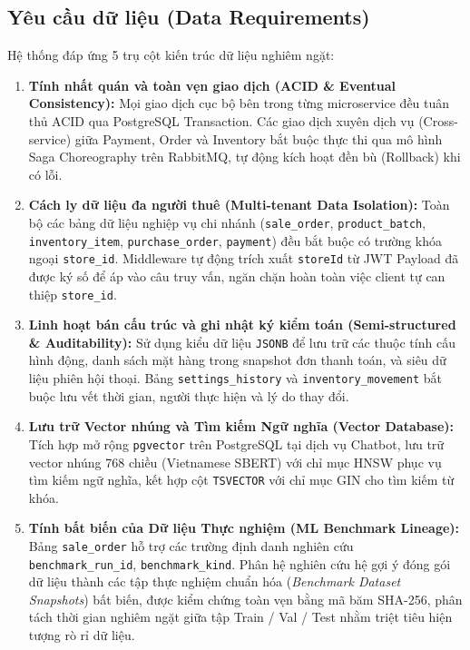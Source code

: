 \documentclass[12pt,a4paper]{report}
\begin{document}
\subsection{Yêu cầu dữ liệu (Data Requirements)}
Hệ thống đáp ứng 5 trụ cột kiến trúc dữ liệu nghiêm ngặt:
\begin{enumerate}
    \item \textbf{Tính nhất quán và toàn vẹn giao dịch (ACID \& Eventual Consistency):} Mọi giao dịch cục bộ bên trong từng microservice đều tuân thủ ACID qua PostgreSQL Transaction. Các giao dịch xuyên dịch vụ (Cross-service) giữa Payment, Order và Inventory bắt buộc thực thi qua mô hình Saga Choreography trên RabbitMQ, tự động kích hoạt đền bù (Rollback) khi có lỗi.
    \item \textbf{Cách ly dữ liệu đa người thuê (Multi-tenant Data Isolation):} Toàn bộ các bảng dữ liệu nghiệp vụ chi nhánh (\texttt{sale\_order}, \texttt{product\_batch}, \texttt{inventory\_item}, \texttt{purchase\_order}, \texttt{payment}) đều bắt buộc có trường khóa ngoại \texttt{store\_id}. Middleware tự động trích xuất \texttt{storeId} từ JWT Payload đã được ký số để áp vào câu truy vấn, ngăn chặn hoàn toàn việc client tự can thiệp \texttt{store\_id}.
    \item \textbf{Linh hoạt bán cấu trúc và ghi nhật ký kiểm toán (Semi-structured \& Auditability):} Sử dụng kiểu dữ liệu \texttt{JSONB} để lưu trữ các thuộc tính cấu hình động, danh sách mặt hàng trong snapshot đơn thanh toán, và siêu dữ liệu phiên hội thoại. Bảng \texttt{settings\_history} và \texttt{inventory\_movement} bắt buộc lưu vết thời gian, người thực hiện và lý do thay đổi.
    \item \textbf{Lưu trữ Vector nhúng và Tìm kiếm Ngữ nghĩa (Vector Database):} Tích hợp mở rộng \texttt{pgvector} trên PostgreSQL tại dịch vụ Chatbot, lưu trữ vector nhúng 768 chiều (Vietnamese SBERT) với chỉ mục HNSW phục vụ tìm kiếm ngữ nghĩa, kết hợp cột \texttt{TSVECTOR} với chỉ mục GIN cho tìm kiếm từ khóa.
    \item \textbf{Tính bất biến của Dữ liệu Thực nghiệm (ML Benchmark Lineage):} Bảng \texttt{sale\_order} hỗ trợ các trường định danh nghiên cứu \texttt{benchmark\_run\_id}, \texttt{benchmark\_kind}. Phân hệ nghiên cứu hệ gợi ý đóng gói dữ liệu thành các tập thực nghiệm chuẩn hóa (\textit{Benchmark Dataset Snapshots}) bất biến, được kiểm chứng toàn vẹn bằng mã băm SHA-256, phân tách thời gian nghiêm ngặt giữa tập Train / Val / Test nhằm triệt tiêu hiện tượng rò rỉ dữ liệu.
\end{enumerate}
\end{document}
